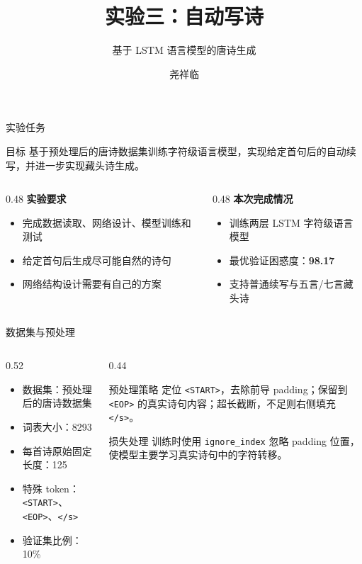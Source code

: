 \documentclass[aspectratio=169,10pt]{ctexbeamer}
\title{实验三：自动写诗}
\subtitle{基于 LSTM 语言模型的唐诗生成}
\author{尧祥临 \quad 202518023406038}
\institute{中国科学院大学 \quad 前沿交叉科学学院\\2026年春季学期\quad 深度学习}
\date{}
\begin{document}
\begin{frame}
	\titlepage
\end{frame}

\begin{frame}{实验任务}
	\begin{block}{目标}
		基于预处理后的唐诗数据集训练字符级语言模型，实现给定首句后的自动续写，并进一步实现藏头诗生成。
	\end{block}

	\begin{columns}[T,onlytextwidth]
		\begin{column}{0.48\textwidth}
			\textbf{实验要求}
			\begin{itemize}
				\item 完成数据读取、网络设计、模型训练和测试
				\item 给定首句后生成尽可能自然的诗句
				\item 网络结构设计需要有自己的方案
			\end{itemize}
		\end{column}
		\begin{column}{0.48\textwidth}
			\textbf{本次完成情况}
			\begin{itemize}
				\item 训练两层 LSTM 字符级语言模型
				\item 最优验证困惑度：\textbf{98.17}
				\item 支持普通续写与五言/七言藏头诗
			\end{itemize}
		\end{column}
	\end{columns}
\end{frame}

\begin{frame}{数据集与预处理}
	\begin{columns}[T,onlytextwidth]
		\begin{column}{0.52\textwidth}
			\begin{itemize}
				\item 数据集：预处理后的唐诗数据集
				\item 词表大小：8293
				\item 每首诗原始固定长度：125
				\item 特殊 token：\texttt{<START>}、\texttt{<EOP>}、\texttt{</s>}
				\item 验证集比例：10\%
			\end{itemize}
		\end{column}
		\begin{column}{0.44\textwidth}
			\begin{block}{预处理策略}
				定位 \texttt{<START>}，去除前导 padding；保留到 \texttt{<EOP>} 的真实诗句内容；超长截断，不足则右侧填充 \texttt{</s>}。
			\end{block}
			\begin{block}{损失处理}
				训练时使用 \texttt{ignore\_index} 忽略 padding 位置，使模型主要学习真实诗句中的字符转移。
			\end{block}
		\end{column}
	\end{columns}
\end{frame}
\end{document}
